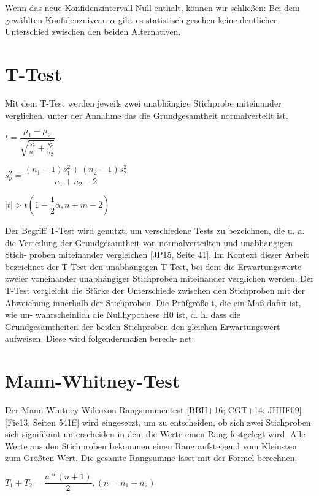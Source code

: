 Wenn das neue Konfidenzintervall Null enthält, können wir schließen:
Bei dem gewählten Konfidenzniveau $\alpha$ gibt es statistisch gesehen keine
deutlicher Unterschied zwischen den beiden Alternativen.

\section{T-Test}
Mit dem T-Test werden jeweils zwei unabhängige Stichprobe miteinander verglichen, 
unter der Annahme das die Grundgesamtheit normalverteilt ist.

\begin{center}
  $t = \dfrac{\mu_1-\mu_2}{\sqrt{\frac{s_p^2}{n_1} + \frac{s_p^2}{n_2}}}$
\end{center}

\begin{center}
  $s^2_p = \dfrac{(n_1 - 1)s^2_1 + (n_2 - 1)s^2_2}{n_1 + n_2 - 2}$
\end{center}

\begin{center}
  $|t| > t(1 - \dfrac{1}{2}\alpha, n + m - 2)$
\end{center}

Der Begriff T-Test wird genutzt, um verschiedene Tests zu bezeichnen, die
u. a. die Verteilung der Grundgesamtheit von normalverteilten und unabhängigen Stich-
proben miteinander vergleichen [JP15, Seite 41]. Im Kontext dieser Arbeit bezeichnet
der T-Test den unabhängigen T-Test, bei dem die Erwartungswerte zweier voneinander
unabhängiger Stichproben miteinander verglichen werden.
Der T-Test vergleicht die Stärke der Unterschiede zwischen den Stichproben mit der
Abweichung innerhalb der Stichproben. Die Prüfgröße t, die ein Maß dafür ist, wie un-
wahrscheinlich die Nullhypothese H0 ist, d. h. dass die Grundgesamtheiten der beiden
Stichproben den gleichen Erwartungswert aufweisen. Diese wird folgendermaßen berech-
net:

\section{Mann-Whitney-Test}
Der Mann-Whitney-Wilcoxon-Rangsummentest [BBH+16; CGT+14; JHHF09]
[Fie13, Seiten 541ff] wird eingesetzt, um zu entscheiden, ob sich zwei
Stichproben sich signifikant unterscheiden in dem die Werte einen Rang festgelegt wird. 
Alle Werte aus den Stichproben bekommen einen Rang aufsteigend vom Kleinsten zum Größten Wert.
Die gesamte Rangsumme lässt mit der Formel berechnen:
\begin{center}
  $T_1 + T_2 = \dfrac{n * (n + 1)}{2}, (n = n_1 + n_2)$
\end{center}  

